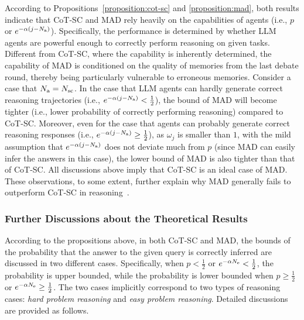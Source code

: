 \documentclass{article} %
\theoremstyle{plain}
\begin{document}
According to Propositions~\ref{proposition:cot-sc} and \ref{proposition:mad}, both results indicate that CoT-SC and MAD rely heavily on the capabilities of agents (i.e., $p$ or $e^{-\alpha (j-N_{\rm a})}$). Specifically, the performance is determined by whether LLM agents are powerful enough to correctly perform reasoning on given tasks. %
Different from CoT-SC, where the capability is inherently determined, the capability of MAD is conditioned on the quality of memories from the last debate round, thereby being particularly vulnerable to erroneous memories. Consider a case that $N_{\rm a}=N_{\rm sc}$. In the case that LLM agents can hardly generate correct reasoning trajectories (i.e., $e^{-\alpha (j-N_{\rm a})}<\frac{1}{2}$), %
the bound of MAD will become tighter (i.e., lower probability of correctly performing reasoning) compared to CoT-SC. Moreover, even for the case that agents can probably generate correct reasoning responses (i.e., $e^{-\alpha (j-N_{\rm a})}\ge\frac{1}{2}$), as $\omega_j$ is smaller than $1$, with the mild assumption that $e^{-\alpha (j-N_{\rm a})}$ does not deviate much from $p$ (since MAD can easily infer the answers in this case), the lower bound of MAD is also tighter than that of CoT-SC. All discussions above imply that CoT-SC is an ideal case of MAD. These observations, to some extent, further explain why MAD generally fails to outperform CoT-SC in reasoning~\citep{huang2023large}.

\vspace{-6pt}
\subsubsection{Further Discussions about the Theoretical Results}
\label{subsubsec:further_discussion}
\vspace{-3pt}
According to the propositions above, in both CoT-SC and MAD, the bounds of the probability that the answer to the given query is correctly inferred are discussed in two different cases. Specifically, when $p<\frac{1}{2}$ or $e^{-\alpha N_{\rm e}}<\frac{1}{2}$, the probability is upper bounded, while the probability is lower bounded when $p\ge\frac{1}{2}$ or $e^{-\alpha N_{\rm e}}\ge\frac{1}{2}$. The two cases implicitly correspond to two types of reasoning cases: \textit{hard problem reasoning} and \textit{easy problem reasoning}. Detailed discussions are provided as follows. %
\end{document}
